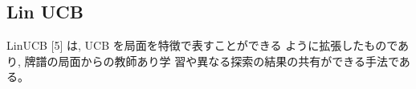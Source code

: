 \subsection{Lin UCB}
LinUCB [5] は, UCB を局面を特徴で表すことができる ように拡張したものであり, 牌譜の局面からの教師あり学 習や異なる探索の結果の共有ができる手法である。
